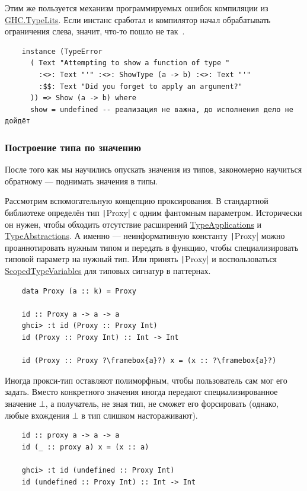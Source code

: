Этим же пользуется механизм программируемых ошибок компиляции из \href{https://hackage.haskell.org/package/base-4.20.0.1/docs/GHC-TypeLits.html}{GHC.TypeLits}.
Если инстанс сработал и компилятор начал обрабатывать ограничения слева, значит, что-то пошло не так~\cite[глава 12]{maguire-types}.

\begin{verbatim}
    instance (TypeError
      ( Text "Attempting to show a function of type "
        :<>: Text "'" :<>: ShowType (a -> b) :<>: Text "'"
        :$$: Text "Did you forget to apply an argument?"
      )) => Show (a -> b) where
      show = undefined -- реализация не важна, до исполнения дело не дойдёт
\end{verbatim}

\subsubsection{Построение типа по значению} \label{subsubsec:reify}

После того как мы научились опускать значения из типов, закономерно научиться обратному --- поднимать значения в типы.

Рассмотрим вспомогательную концепцию проксирования.
В стандартной библиотеке определён тип \texttt|Proxy| с одним фантомным параметром.
Исторически он нужен, чтобы обходить отсутствие расширений \href{https://downloads.haskell.org/ghc/latest/docs/users_guide/exts/type_applications.html#extension-TypeApplications}{TypeApplications} и \href{https://downloads.haskell.org/ghc/latest/docs/users_guide/exts/type_abstractions.html#extension-TypeAbstractions}{TypeAbstractions}.
А именно --- неинформативную константу \texttt|Proxy| можно проаннотировать нужным типом и передать в функцию, чтобы специализировать типовой параметр на нужный тип.
Или принять \texttt|Proxy| и воспользоваться \href{https://downloads.haskell.org/ghc/latest/docs/users_guide/exts/scoped_type_variables.html#pattern-type-signatures}{ScopedTypeVariables} для типовых сигнатур в паттернах.
\begin{verbatim}
    data Proxy (a :: k) = Proxy

    id :: Proxy a -> a -> a
    ghci> :t id (Proxy :: Proxy Int)
    id (Proxy :: Proxy Int) :: Int -> Int

    id (Proxy :: Proxy ?\framebox{a}?) x = (x :: ?\framebox{a}?)
\end{verbatim}

Иногда прокси-тип оставляют полиморфным, чтобы пользователь сам мог его задать.
Вместо конкретного значения иногда передают специализированное значение $\bot$, а получатель, не зная тип, не сможет его форсировать (однако, любые вхождения $\bot$ в тип слишком настораживают).
\begin{verbatim}
    id :: proxy a -> a -> a
    id (_ :: proxy a) x = (x :: a)

    ghci> :t id (undefined :: Proxy Int)
    id (undefined :: Proxy Int) :: Int -> Int
\end{verbatim}

